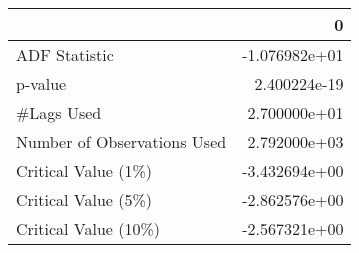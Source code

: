 \begin{tabular}{lr}
\toprule
{} &             0 \\
\midrule
ADF Statistic               & -1.076982e+01 \\
p-value                     &  2.400224e-19 \\
\#Lags Used                  &  2.700000e+01 \\
Number of Observations Used &  2.792000e+03 \\
Critical Value (1\%)         & -3.432694e+00 \\
Critical Value (5\%)         & -2.862576e+00 \\
Critical Value (10\%)        & -2.567321e+00 \\
\bottomrule
\end{tabular}
